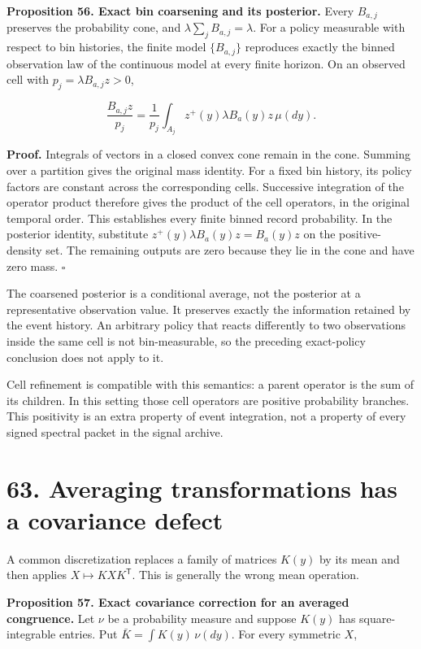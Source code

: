 \documentclass[11pt,letterpaper]{article}
\begin{document}
\textbf{Proposition 56. Exact bin coarsening and its posterior.} Every
\(B_{a,j}\) preserves the probability cone, and
\(\lambda\sum_jB_{a,j}=\lambda\). For a policy measurable with respect
to bin histories, the finite model \(\{B_{a,j}\}\) reproduces exactly
the binned observation law of the continuous model at every finite
horizon. On an observed cell with \(p_j=\lambda B_{a,j}z>0\),

\[
\frac{B_{a,j}z}{p_j}
=\frac1{p_j}\int_{A_j}z^+(y)\lambda B_a(y)z\,\mu(dy).
\]

\textbf{Proof.} Integrals of vectors in a closed convex cone remain in
the cone. Summing over a partition gives the original mass identity. For
a fixed bin history, its policy factors are constant across the
corresponding cells. Successive integration of the operator product
therefore gives the product of the cell operators, in the original
temporal order. This establishes every finite binned record probability.
In the posterior identity, substitute \(z^+(y)\lambda B_a(y)z=B_a(y)z\)
on the positive-density set. The remaining outputs are zero because they
lie in the cone and have zero mass. \(\square\)

The coarsened posterior is a conditional average, not the posterior at a
representative observation value. It preserves exactly the information
retained by the event history. An arbitrary policy that reacts
differently to two observations inside the same cell is not
bin-measurable, so the preceding exact-policy conclusion does not apply
to it.

Cell refinement is compatible with this semantics: a parent operator is
the sum of its children. In this setting those cell operators are
positive probability branches. This positivity is an extra property of
event integration, not a property of every signed spectral packet in the
signal archive.

\section{63. Averaging transformations has a covariance
defect}\label{averaging-transformations-has-a-covariance-defect}

A common discretization replaces a family of matrices \(K(y)\) by its
mean and then applies \(X\mapsto KXK^{\mathsf T}\). This is generally
the wrong mean operation.

\textbf{Proposition 57. Exact covariance correction for an averaged
congruence.} Let \(\nu\) be a probability measure and suppose \(K(y)\)
has square-integrable entries. Put \(\bar K=\int K(y)\,\nu(dy)\). For
every symmetric \(X\),
\end{document}
